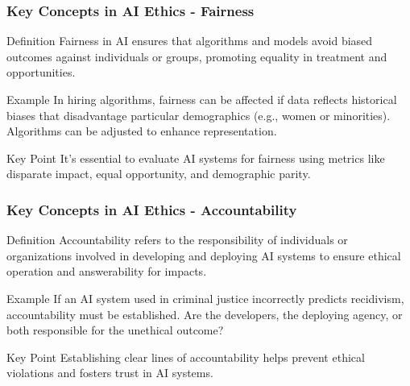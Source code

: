 \documentclass[aspectratio=169]{beamer}
\begin{document}
\begin{frame}[fragile]
    \frametitle{Key Concepts in AI Ethics - Fairness}
    \begin{block}{Definition}
        Fairness in AI ensures that algorithms and models avoid biased outcomes against individuals or groups, promoting equality in treatment and opportunities.
    \end{block}
    
    \begin{block}{Example}
        In hiring algorithms, fairness can be affected if data reflects historical biases that disadvantage particular demographics (e.g., women or minorities). 
        Algorithms can be adjusted to enhance representation.
    \end{block}
    
    \begin{block}{Key Point}
        It’s essential to evaluate AI systems for fairness using metrics like disparate impact, equal opportunity, and demographic parity.
    \end{block}
\end{frame}

\begin{frame}[fragile]
    \frametitle{Key Concepts in AI Ethics - Accountability}
    \begin{block}{Definition}
        Accountability refers to the responsibility of individuals or organizations involved in developing and deploying AI systems to ensure ethical operation and answerability for impacts.
    \end{block}
    
    \begin{block}{Example}
        If an AI system used in criminal justice incorrectly predicts recidivism, accountability must be established. Are the developers, the deploying agency, or both responsible for the unethical outcome?
    \end{block}
    
    \begin{block}{Key Point}
        Establishing clear lines of accountability helps prevent ethical violations and fosters trust in AI systems.
    \end{block}
\end{frame}
\end{document}
